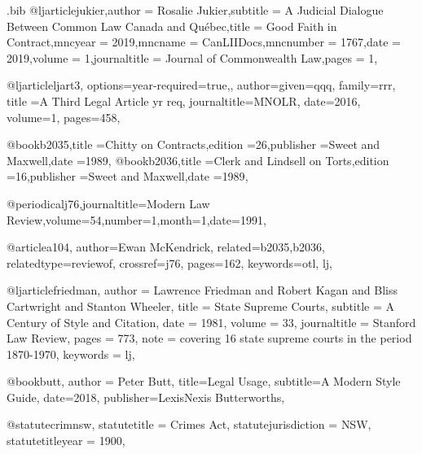 \begin{filecontents*}{\jobname.bib}
@ljarticle{jukier,author = {Rosalie Jukier},subtitle = {A Judicial Dialogue Between Common Law Canada and Québec},title = {Good Faith in Contract},mncyear = {2019},mncname = {CanLIIDocs},mncnumber = {1767},date = {2019},volume = {1},journaltitle = {Journal of Commonwealth Law},pages = {1},}



@ljarticle{ljart3,
options={year-required=true,},
author={given=qqq, family=rrr},
title ={A Third Legal Article yr req},
journaltitle={MNOLR},
date={2016},
volume={1},
pages={458},
}

@book{b2035,title ={Chitty on Contracts},edition ={26},publisher ={Sweet and Maxwell},date ={1989},}
@book{b2036,title ={Clerk and Lindsell on Torts},edition ={16},publisher ={Sweet and Maxwell},date ={1989},}

@periodical{j76,journaltitle={Modern Law Review},volume={54},number={1},month={1},date={1991},}

@article{a104,
author={Ewan McKendrick},
related={b2035,b2036},
relatedtype={reviewof},
crossref={j76},
pages={162},
keywords={otl, lj},
}




@ljarticle{friedman,
author = {Lawrence Friedman and Robert Kagan and Bliss Cartwright and Stanton Wheeler},
title = {State Supreme Courts},
subtitle = {A Century of Style and Citation},
date = {1981},
volume = {33},
journaltitle = {Stanford Law Review},
pages = {773},
note = {covering 16 state supreme courts in the period 1870-1970},
keywords = {lj},
}



@book{butt,
author = {Peter Butt},
title={Legal Usage},
subtitle={A Modern Style Guide},
date={2018},
publisher={LexisNexis Butterworths},
}


@statute{crimnsw,
statutetitle = {Crimes Act},
statutejurisdiction = {NSW},
statutetitleyear = {1900},%
}


\end{filecontents*}
